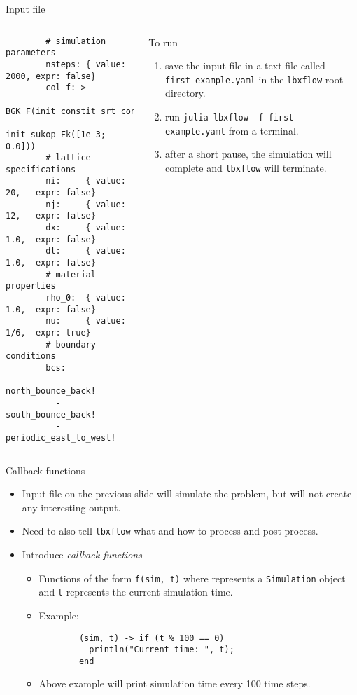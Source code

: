 \documentclass[pdf]{beamer}
\begin{document}
\begin{frame}[fragile]{Input file} \label{frm:input-file-start}
      \tiny
  \begin{columns}
      \begin{verbatim}
        # simulation parameters
        nsteps: { value: 2000, expr: false}
        col_f: >
               BGK_F(init_constit_srt_const(1/6),
                     init_sukop_Fk([1e-3; 0.0]))
        # lattice specifications
        ni:     { value: 20,   expr: false}
        nj:     { value: 12,   expr: false}
        dx:     { value: 1.0,  expr: false}
        dt:     { value: 1.0,  expr: false}
        # material properties
        rho_0:  { value: 1.0,  expr: false}
        nu:     { value: 1/6,  expr: true}
        # boundary conditions
        bcs:
          - north_bounce_back!
          - south_bounce_back!
          - periodic_east_to_west!
      \end{verbatim}
    \begin{block}{To run}
    \begin{enumerate}
     \item save the input file in a text file called \texttt{first-example.yaml} in the \texttt{lbxflow} root directory.
     \item run \texttt{julia lbxflow -f first-example.yaml} from a terminal.
     \item after a short pause, the simulation will complete and \texttt{lbxflow} will terminate.
    \end{enumerate}
    \end{block}
  \end{columns}
\end{frame}

\begin{frame}[fragile]{Callback functions}
  \begin{itemize}
    \item Input file on the previous slide will simulate the problem, but will not create any interesting output.
      \pause
    \item Need to also tell \texttt{lbxflow} what and how to process and post-process.
    \item Introduce \textit{callback functions}
      \begin{itemize}
        \item Functions of the form \texttt{f(sim, t)} where  represents a \texttt{Simulation} object and \texttt{t} represents the current simulation time.
        \item Example:
        \begin{lstlisting}
        (sim, t) -> if (t % 100 == 0)
          println("Current time: ", t);
        end
        \end{lstlisting}
      \item Above example will print simulation time every 100 time steps.
      \end{itemize}
  \end{itemize}
  
\end{frame}
\end{document}
